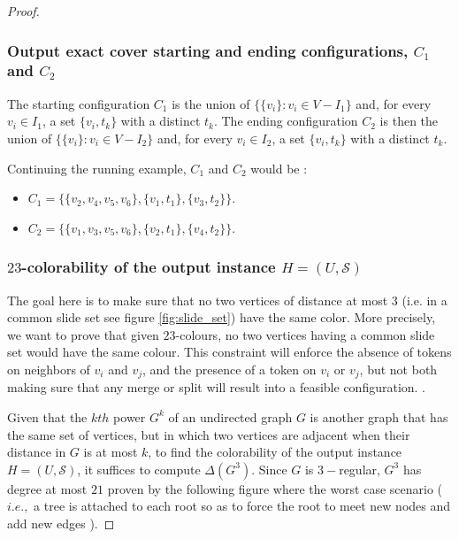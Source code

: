 \begin{proof}
\subsubsection{Output exact cover starting and ending configurations, $C_1$ and $C_2$}
The starting configuration $C_1$ is the union of $\{\{ v_i \} : v_i \in V - I_1\}$ and, for every $v_i \in I_1$, a set $\{v_i, t_k\}$ with a
distinct $t_k$.
The ending configuration $C_2$ is then the union of $\{\{ v_i \} : v_i \in V - I_2\}$ and, for every $v_i \in I_2$, a set $\{v_i, t_k\}$ with a
distinct $t_k$.

\begin{example}Continuing the running example, $C_1$ and $C_2$ would be :
\begin{itemize}
  \item $C_1 = \{ \{v_2, v_4, v_5, v_6\}, \{v_1, t_1\}, \{v_3, t_2\}\}$.
  \item $C_2 = \{ \{v_1, v_3, v_5, v_6\}, \{v_2, t_1\}, \{v_4, t_2\}\}$.
\end{itemize}
\end{example}

\subsubsection{$23$-colorability of the output instance $H = (U, \mathcal{S})$}\label{subsubsection:23_colorability}
The goal here is to make sure that no two vertices of distance at most $3$ (i.e. in a common slide set see figure \ref{fig:slide_set}) have the same
color. More precisely, we want to prove that given $23$-colours, no two vertices having a common slide set would have the same colour.
This constraint will enforce the absence of tokens on neighbors of $v_i$ and $v_j$, and the presence of a token on $v_i$ or $v_j$, but not both
making sure that any merge or split will result into a feasible configuration. .

Given that the $kth$ power $G^{k}$ of an undirected graph $G$ is another graph that has the same set of vertices, but in which two vertices are
adjacent when their distance in $G$ is at most $k$, to find the colorability of the output instance $H = (U, \mathcal{S})$, it suffices to
compute $\Delta(G^{3})$. Since $G$ is $3-$regular, $G^3$ has degree at most $21$ proven by the following figure where the worst case
scenario ($i.e.,$ a tree is attached to each root so as to force the root to meet new nodes and add new edges ).



\end{proof}
